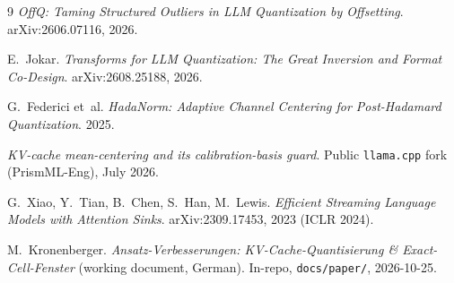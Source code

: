 \documentclass[10pt,twocolumn]{article}
\begin{document}
\begin{thebibliography}{9}
\emph{OffQ: Taming Structured Outliers in LLM Quantization by Offsetting}.
arXiv:2606.07116, 2026.

E.~Jokar.
\emph{Transforms for LLM Quantization: The Great Inversion and Format Co-Design}.
arXiv:2608.25188, 2026.

G.~Federici et~al.
\emph{HadaNorm: Adaptive Channel Centering for Post-Hadamard Quantization}. 2025.

\emph{KV-cache mean-centering and its calibration-basis guard}.
Public \texttt{llama.cpp} fork (PrismML-Eng), July 2026.

G.~Xiao, Y.~Tian, B.~Chen, S.~Han, M.~Lewis.
\emph{Efficient Streaming Language Models with Attention Sinks}.
arXiv:2309.17453, 2023 (ICLR 2024).

M.~Kronenberger.
\emph{Ansatz-Verbesserungen: KV-Cache-Quantisierung \& Exact-Cell-Fenster}
(working document, German). In-repo, \texttt{docs/paper/}, 2026-10-25.

\end{thebibliography}
\end{document}
